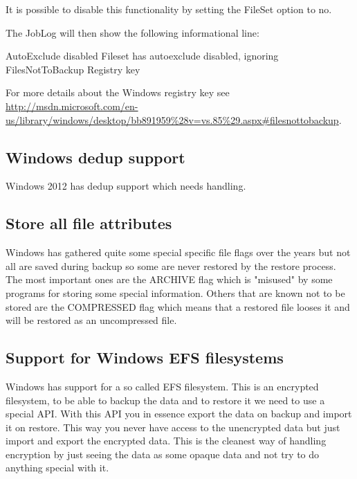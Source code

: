 It is possible to disable this functionality by setting the FileSet option  to no.

The JobLog will then show the following informational line:
\begin{bmessage}{AutoExclude disabled}
Fileset has autoexclude disabled, ignoring FilesNotToBackup Registry key
\end{bmessage}

For more details about the Windows registry key see 
\url{http://msdn.microsoft.com/en-us/library/windows/desktop/bb891959\%28v=vs.85\%29.aspx#filesnottobackup}.

\subsection{Windows dedup support}


   Windows 2012 has dedup support which needs handling.


\subsection{Store all file attributes}


   Windows has gathered quite some special specific file
   flags over the years but not all are saved during backup so
   some are never restored by the restore process. The most
   important ones are the ARCHIVE flag which is "misused" by
   some programs for storing some special information. Others
   that are known not to be stored are the COMPRESSED flag which
   means that a restored file looses it and will be restored as
   an uncompressed file.

\subsection{Support for Windows EFS filesystems}


  Windows has support for a so called EFS
  filesystem. This is an encrypted filesystem, to be able to backup the
  data and to restore it we need to use a special API. With this API you
  in essence export the data on backup and import it on restore. This
  way you never have access to the unencrypted data but just import and
  export the encrypted data. This is the cleanest way of handling
  encryption by just seeing the data as some opaque data and not try to
  do anything special with it.



